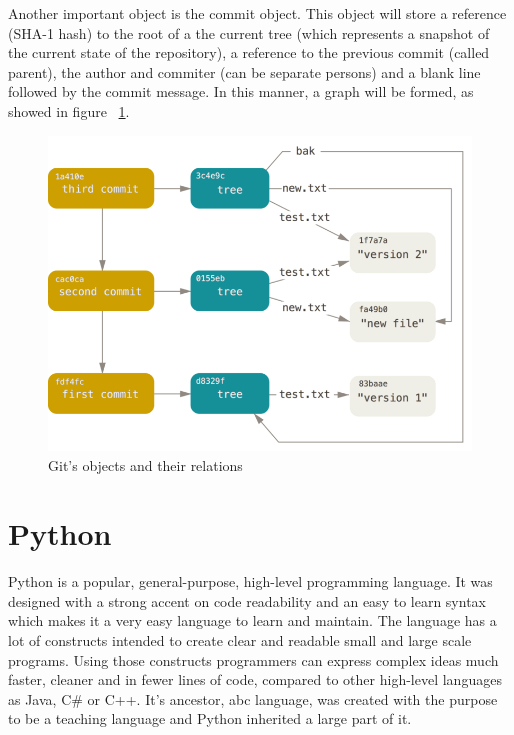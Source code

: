         Another important object is the commit object. This object will store a reference (SHA-1 hash) to the root of a the current tree (which represents a snapshot of the current state of the repository), a reference to the previous commit (called parent), the author and commiter (can be separate persons) and a blank line followed by the commit message. In this manner, a graph will be formed, as showed in figure ~\ref{fig:gitobjectsrelations}.

         \begin{figure}[h]
           \begin{center}
               \includegraphics[width=\textwidth]{theoretical/data-model-3.png}
            \end{center}
            \caption{\label{fig:gitobjectsrelations} Git's objects and their relations \cite{GDM}}
        \end{figure}

\section{Python}
    Python is a popular, general-purpose, high-level programming language. It was designed with a strong accent on code readability and an easy to learn syntax which makes it a very easy language to learn and maintain. The language has a lot of constructs intended to create clear and readable small and large scale programs. Using those constructs programmers can express complex ideas much faster, cleaner and in fewer lines of code, compared to other high-level languages as Java, C\# or C++. It's ancestor, abc language, was created with the purpose to be a teaching language and Python inherited a large part of it.

